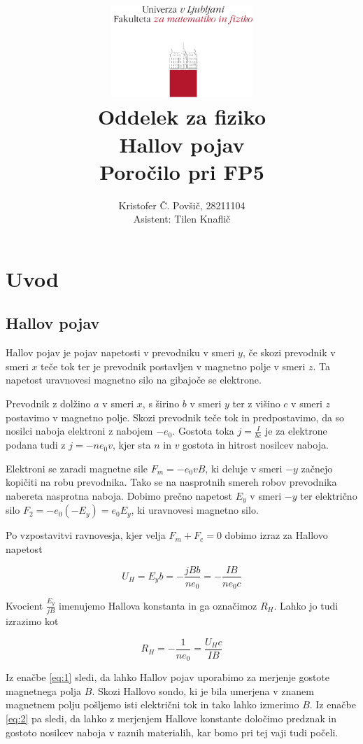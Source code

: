 \documentclass[11pt]{article}
\title{
  \includegraphics[width=0.4\textwidth]{fmf_logo}\\
  {\small Oddelek za fiziko} \\
  {Hallov pojav}\\
  {\small Poročilo pri FP5}\\

}
\date{}
\author{ Kristofer Č. Povšič, 28211104 \\[5 cm]
 \small  Asistent: Tilen Knaflič \\
}
\begin{document}
\maketitle
\newpage
\tableofcontents
\newpage

\section{Uvod}\label{sec:org4245ae2}

\subsection{Hallov pojav}\label{sec:orgfbbc1a9}

Hallov pojav je pojav napetosti v prevodniku v smeri \(y\), če skozi prevodnik v smeri \(x\) teče tok ter je prevodnik postavljen v magnetno polje v smeri \(z\). Ta napetost uravnovesi magnetno silo na gibajoče se elektrone.

Prevodnik z dolžino \(a\) v smeri \(x\), s širino \(b\) v smeri \(y\) ter z višino \(c\) v smeri \(z\) postavimo v magnetno polje. Skozi prevodnik teče tok in predpostavimo, da so nosilci naboja elektroni z nabojem \(-e_0\). Gostota toka \(j = \frac{I}{bc}\) je za elektrone podana tudi z \(j = - ne_0v\), kjer sta \(n\) in \(v\) gostota in hitrost nosilcev naboja.

Elektroni se zaradi magnetne sile \(F_m = - e_0v B\), ki deluje v smeri \(-y\) začnejo kopičiti na robu prevodnika. Tako se na nasprotnih smereh robov prevodnika nabereta nasprotna naboja. Dobimo prečno napetost \(E_y\) v smeri \(-y\) ter električno silo \(F_2 = -e_0 (-E_y) = e_0E_y\), ki uravnovesi magnetno silo.

Po vzpostavitvi ravnovesja, kjer velja \(F_m + F_e = 0\) dobimo izraz za Hallovo napetost

\begin{equation}
\label{eq:1}
U_H = E_y b = - \frac{jBb}{ne_0} = - \frac{I B}{ne_0 c}
\end{equation}

Kvocient \(\frac{E_y}{jB}\) imenujemo Hallova konstanta in ga označimoz \(R_H\). Lahko jo tudi izrazimo kot

\begin{equation}
\label{eq:2}
R_H = - \frac{1}{ne_0} = \frac{U_H c}{IB}
\end{equation}

Iz enačbe \ref{eq:1} sledi, da lahko Hallov pojav uporabimo za merjenje gostote magnetnega polja \(B\). Skozi Hallovo sondo, ki je bila umerjena v znanem magnetnem polju pošljemo isti električni tok in tako lahko izmerimo \(B\). Iz enačbe \ref{eq:2} pa sledi, da lahko z merjenjem Hallove konstante določimo predznak in gostoto nosilcev naboja v raznih materialih, kar bomo pri tej vaji tudi počeli.
\end{document}
